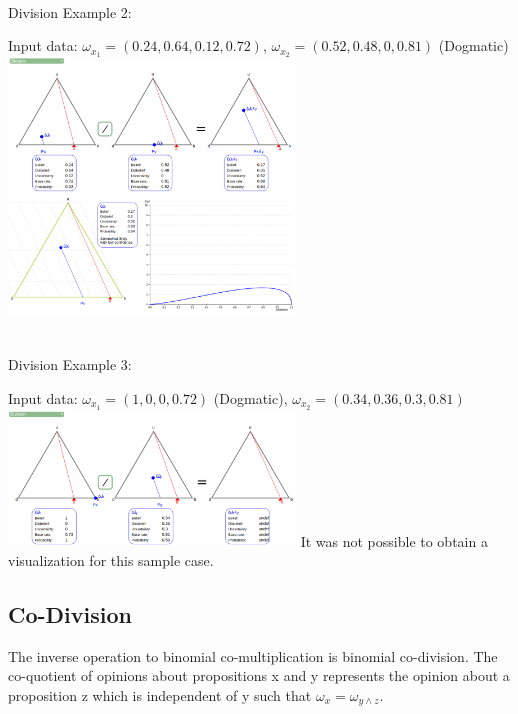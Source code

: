 \documentclass[UTF8]{article}
\newcommand{\opinion}[5]{$\omega_{#1} = (#2, #3, #4, #5)$}
\begin{document}
\hrulefill\\
Division Example 2:
    \begin{center}
        Input data: 
        \opinion{x_1}{0.24}{0.64}{0.12}{0.72}, 
        \opinion{x_2}{0.52}{0.48}{0}{0.81} (Dogmatic)
        \includegraphics[width=3in]{images/div2.png}
        \includegraphics[width=3in]{images/div2viz.png}
    \end{center}
    \hrulefill\\
Division Example 3:
    \begin{center}
        Input data: 
        \opinion{x_1}{1}{0}{0}{0.72} (Dogmatic), 
        \opinion{x_2}{0.34}{0.36}{0.3}{0.81}\\
        \includegraphics[width=3in]{images/div3.png}
        It was not possible to obtain a visualization for this sample case.
\end{center}

\subsection{Co-Division}
The inverse operation to binomial co-multiplication is binomial co-division. The co-quotient
of opinions about propositions x and y represents the opinion about a proposition z
which is independent of y such that $\omega_x = \omega_{y \land z}$.
\end{document}
